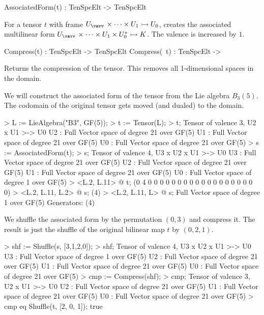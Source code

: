 \begin{intrinsics}
AssociatedForm(t) : TenSpcElt -> TenSpcElt
\end{intrinsics}

For a tensor $t$ with frame $U_{\vav}\times \cdots \times U_1\rightarrowtail U_0$,
creates the associated multilinear form
$U_{\vav}\times\cdots\times U_1\times U_0^*\rightarrowtail K$. 
The valence is increased by $1$.

\begin{intrinsics}
Compress(t) : TenSpcElt -> TenSpcElt
Compress(~t) : TenSpcElt -> 
\end{intrinsics}

Returns the compression of the tensor. This removes all 1-dimensional spaces in the domain.

\begin{example}[CompressAssocForm]

We will construct the associated form of the tensor from the Lie algebra $B_3(5)$. 
The codomain of the original tensor gets moved (and dualed) to the domain. 
\begin{code}
> L := LieAlgebra("B3", GF(5));
> t := Tensor(L); 
> t;
Tensor of valence 3, U2 x U1 >-> U0
U2 : Full Vector space of degree 21 over GF(5)
U1 : Full Vector space of degree 21 over GF(5)
U0 : Full Vector space of degree 21 over GF(5)
> s := AssociatedForm(t);
> s;
Tensor of valence 4, U3 x U2 x U1 >-> U0
U3 : Full Vector space of degree 21 over GF(5)
U2 : Full Vector space of degree 21 over GF(5)
U1 : Full Vector space of degree 21 over GF(5)
U0 : Full Vector space of degree 1 over GF(5)
> <L.2, L.11> @ t;
(0 4 0 0 0 0 0 0 0 0 0 0 0 0 0 0 0 0 0 0 0)
> <L.2, L.11, L.2> @ s;
(4)
> <L.2, L.11, L> @ s;
Full Vector space of degree 1 over GF(5)
Generators:
(4)
\end{code}

We shuffle the associated form by the permutation $(0,3)$ and compress it.
The result is just the shuffle of the original bilinear map $t$ by $(0,2,1)$.

\begin{code}
> shf := Shuffle(s, [3,1,2,0]);
> shf;
Tensor of valence 4, U3 x U2 x U1 >-> U0
U3 : Full Vector space of degree 1 over GF(5)
U2 : Full Vector space of degree 21 over GF(5)
U1 : Full Vector space of degree 21 over GF(5)
U0 : Full Vector space of degree 21 over GF(5)
> cmp := Compress(shf);
> cmp;
Tensor of valence 3, U2 x U1 >-> U0
U2 : Full Vector space of degree 21 over GF(5)
U1 : Full Vector space of degree 21 over GF(5)
U0 : Full Vector space of degree 21 over GF(5)
> cmp eq Shuffle(t, [2, 0, 1]);
true
\end{code}
\end{example}

